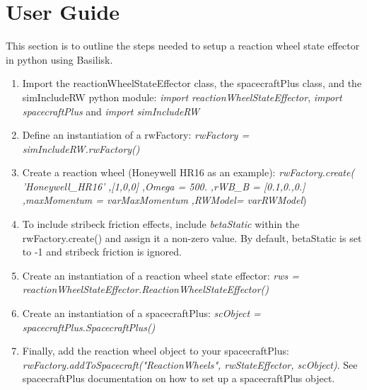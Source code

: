 \section{User Guide}

This section is to outline the steps needed to setup a reaction wheel state effector in python using Basilisk.

\begin{enumerate}
	\item Import the reactionWheelStateEffector class, the spacecraftPlus class, and the simIncludeRW python module: \newline \textit{import reactionWheelStateEffector}, \textit{import spacecraftPlus} and \textit{import simIncludeRW}
	\item Define an instantiation of a rwFactory: \newline
	\textit{rwFactory = simIncludeRW.rwFactory()}
	\item Create a reaction wheel (Honeywell HR16 as an example): \newline \textit{rwFactory.create(} \newline
		\textit{'Honeywell\_HR16'} \newline
		\textit{,[1,0,0]} \newline
		\textit{,Omega = 500.} \newline
		\textit{,rWB\_B = [0.1,0.,0.]} \newline
		\textit{,maxMomentum = varMaxMomentum} \newline
		\textit{,RWModel= varRWModel})
	\item To include stribeck friction effects, include \textit{ betaStatic } within the rwFactory.create() and assign it a non-zero value. By default, betaStatic is set to -1 and stribeck friction is ignored. 
	\item Create an instantiation of a reaction wheel state effector: \newline \textit{rws = reactionWheelStateEffector.ReactionWheelStateEffector()}
	\item Create an instantiation of a spacecraftPlus: \newline
	\textit{scObject = spacecraftPlus.SpacecraftPlus()}
	\item Finally, add the reaction wheel object to your spacecraftPlus:\newline
	\textit{rwFactory.addToSpacecraft("ReactionWheels", rwStateEffector, scObject)}. See spacecraftPlus documentation on how to set up a spacecraftPlus object. 
\end{enumerate}
